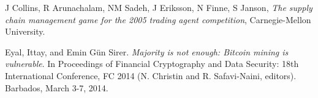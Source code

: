 \documentclass[runningheads, 12pt]{article}
\begin{document}
\noindent[CAS+05]  J Collins, R Arunachalam, NM Sadeh, J Eriksson, N Finne, S Janson, \emph{The supply chain management game for the 2005 trading agent competition}, Carnegie-Mellon University.
\vspace{3pt}

\noindent[ES14] Eyal, Ittay, and Emin Gün Sirer. \emph{Majority is not enough: Bitcoin mining is vulnerable}. In Proceedings of Financial Cryptography and Data Security: 18th International Conference, FC 2014 (N. Christin and R. Safavi-Naini, editors). Barbados, March 3-7, 2014.
\vspace{3pt}
\end{document}
